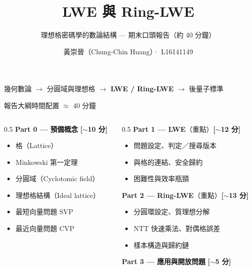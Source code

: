 \documentclass[aspectratio=169, 11pt]{beamer}
\title{LWE 與 Ring-LWE}
\subtitle{理想格密碼學的數論結構 — 期末口頭報告（約 40 分鐘）}
\author{黃崇晉（Chung-Chin Huang）· L16141149}
\institute{數論（一）· 2026 春季 · 國立成功大學}
\date{}
\newcommand{\timetag}[1]{{\small\color{accentlt!50!white}\textbf{[#1]}}}
\begin{document}
\begin{frame}[plain]
  \titlepage
  \begin{center}\small\color{gray}
    幾何數論 $\to$ 分圓域與理想格 $\to$ \textbf{LWE / Ring-LWE} $\to$ 後量子標準
  \end{center}
\end{frame}

\begin{frame}{報告大綱}{時間配置 $\approx$ 40 分鐘}
  \begin{columns}[T]
    \begin{column}{0.5\textwidth}
      \textbf{Part 0 — 預備概念} \timetag{$\sim$10 分}
      \begin{itemize}
        \item 格（Lattice）
        \item Minkowski 第一定理
        \item 分圓域（Cyclotomic field）
        \item 理想格結構（Ideal lattice）
        \item 最短向量問題 SVP
        \item 最近向量問題 CVP
      \end{itemize}
    \end{column}
    \begin{column}{0.5\textwidth}
      \textbf{Part 1 — LWE}（重點）\timetag{$\sim$12 分}\\[-2pt]
      \begin{itemize}\small
        \item 問題設定、判定／搜尋版本
        \item 與格的連結、安全歸約
        \item 困難性與效率瓶頸
      \end{itemize}
      \vspace{4pt}
      \textbf{Part 2 — Ring-LWE}（重點）\timetag{$\sim$13 分}\\[-2pt]
      \begin{itemize}\small
        \item 分圓環設定、質理想分解
        \item NTT 快速乘法、對偶格誤差
        \item 樣本構造與歸約鏈
      \end{itemize}
      \vspace{4pt}
      \textbf{Part 3 — 應用與開放問題} \timetag{$\sim$5 分}
    \end{column}
  \end{columns}
\end{frame}
\end{document}
